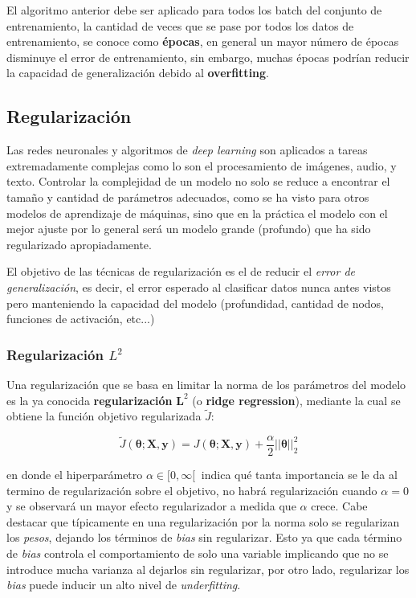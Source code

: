 \begin{remark}
	El algoritmo anterior debe ser aplicado para todos los batch del conjunto de entrenamiento, la cantidad de veces que se pase por todos los datos de entrenamiento, se conoce como \textbf{épocas}, en general un mayor número de épocas disminuye el error de entrenamiento, sin embargo, muchas épocas podrían reducir la capacidad de generalización debido al \textbf{overfitting}.	
\end{remark}

\subsection{Regularización}

Las redes neuronales y algoritmos de \textit{deep learning} son aplicados a tareas extremadamente complejas como lo son el procesamiento de im\'agenes, audio, y texto. Controlar la complejidad de un modelo no solo se reduce a encontrar el tamaño y cantidad de parámetros adecuados, como se ha visto para otros modelos de aprendizaje de m\'aquinas, sino que en la pr\'actica el modelo con el mejor ajuste por lo general ser\'a un modelo grande (profundo) que ha sido regularizado apropiadamente. 

El objetivo de las técnicas de regularización es el de reducir el \textit{error de generalización}, es decir, el error esperado al clasificar datos nunca antes vistos pero manteniendo la capacidad del modelo (profundidad, cantidad de nodos, funciones de activación, etc...)

\subsubsection{Regularización \texorpdfstring{${L}^{2}$}{L2}}

Una regularizaci\'on que se basa en limitar la norma de los parámetros del modelo es la ya conocida \textbf{regularizaci\'on} $\bm{L}^{2}$ (o \textbf{ridge regression}), mediante la cual se obtiene la funci\'on objetivo regularizada $\tilde{J}$:

\begin{equation}
\tilde{J}(\bm{\theta};\bm{X},\bm{y}) = J(\bm{\theta};\bm{X},\bm{y}) + \frac{\alpha}{2}||\bm{\theta}||^{2}_{2}
\end{equation}

en donde el hiperpar\'ametro $\alpha \in [0,\infty[\ $ indica qué tanta importancia se le da al termino de regularización sobre el objetivo, no habrá regularizaci\'on cuando $\alpha = 0$ y se observará un mayor efecto regularizador a medida que $\alpha$ crece. Cabe destacar que t\'ipicamente en una regularizaci\'on por la norma solo se regularizan los \textit{pesos}, dejando los t\'erminos de \textit{bias} sin regularizar. Esto ya que cada t\'ermino de \textit{bias} controla el comportamiento de solo una variable implicando que no se introduce mucha varianza al dejarlos sin regularizar, por otro lado, regularizar los \textit{bias} puede inducir un alto nivel de \textit{underfitting}.

